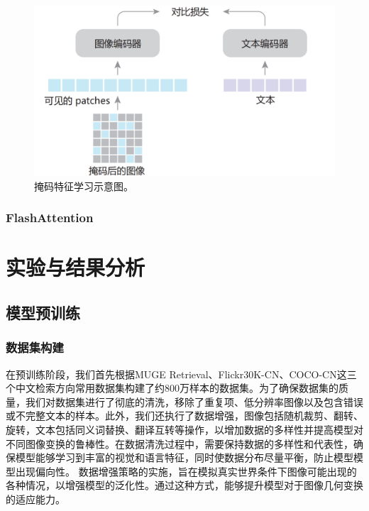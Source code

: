 \documentclass[a4paper]{zreport}
\begin{document}
\begin{figure}[h]
\centering
\includegraphics[width=0.95\linewidth]{figures/mask}
\caption{掩码特征学习示意图。}
\label{fig:mask}
\end{figure}



\subsubsection{FlashAttention}




\section{实验与结果分析}

\subsection{模型预训练}

\subsubsection{数据集构建}
在预训练阶段，我们首先根据MUGE Retrieval、Flickr30K-CN、COCO-CN这三个中文检索方向常用数据集构建了约800万样本的数据集。为了确保数据集的质量，我们对数据集进行了彻底的清洗，移除了重复项、低分辨率图像以及包含错误或不完整文本的样本。此外，我们还执行了数据增强，图像包括随机裁剪、翻转、旋转，文本包括同义词替换、翻译互转等操作，以增加数据的多样性并提高模型对不同图像变换的鲁棒性。在数据清洗过程中，需要保持数据的多样性和代表性，确保模型能够学习到丰富的视觉和语言特征，同时使数据分布尽量平衡，防止模型模型出现偏向性。
数据增强策略的实施，旨在模拟真实世界条件下图像可能出现的各种情况，以增强模型的泛化性。通过这种方式，能够提升模型对于图像几何变换的适应能力。
\end{document}
